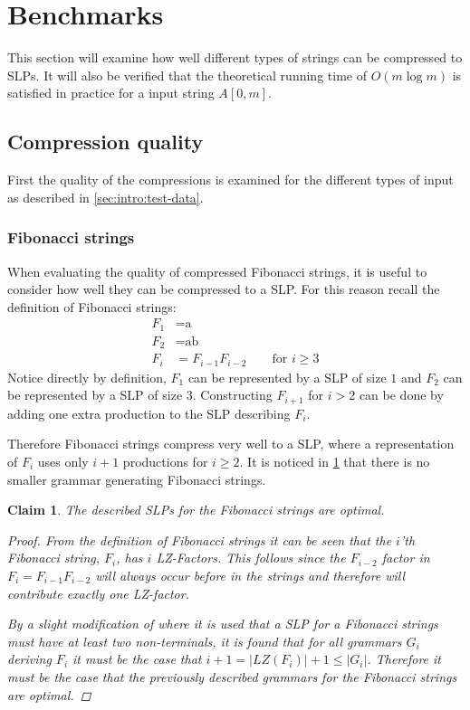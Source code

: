 \documentclass[twoside,11pt,openright]{report}
\newcommand{\str}[3]{#1[#2, #3]}
\newtheorem{claim}{Claim}
\begin{document}
\clearpage
\section{Benchmarks}
\label{sec:compression:benchmarks}
This section will examine how well different types of strings can be compressed to SLPs. It will also be verified that the theoretical running time of $O(m\log{m})$ is satisfied in practice for a input string $\str{A}{0}{m}$.

\subsection{Compression quality}
First the quality of the compressions is examined for the different types of input as described in \cref{sec:intro:test-data}.

\subsubsection{Fibonacci strings}
\label{sec:compressing-Fibonacci-strings}
When evaluating the quality of compressed Fibonacci strings, it is useful to consider how well they can be compressed to a SLP. For this reason recall the definition of Fibonacci strings:
\begin{align*}
  F_1 &= \text{a} \\
  F_2 &= \text{ab} \\
  F_{i} &= F_{i - 1} F_{i - 2} \quad\quad \text{for } i \geq 3
\end{align*}
Notice directly by definition, $F_1$ can be represented by a SLP of size $1$ and $F_2$ can be represented by a SLP of size $3$. Constructing $F_{i + 1}$ for $i > 2$ can be done by adding one extra production to the SLP describing $F_{i}$.

Therefore Fibonacci strings compress very well to a SLP, where a representation of $F_{i}$ uses only $i + 1$ productions for $i \geq 2$. It is noticed in \cref{claim:fib-slp-optimal} that there is no smaller grammar generating Fibonacci strings.

\begin{claim}
  \label{claim:fib-slp-optimal}
  The described SLPs for the Fibonacci strings are optimal.
  \begin{proof}
    From the definition of Fibonacci strings it can be seen that the $i$'th Fibonacci string, $F_i$, has $i$ LZ-Factors. This follows since the $F_{i-2}$ factor in $F_i = F_{i - 1} F_{i - 2}$ will always occur before in the strings and therefore will contribute exactly one LZ-factor.

    By a slight modification of \cite[Theorem 1]{Rytter2003211} where it is used that a SLP for a Fibonacci strings must have at least two non-terminals, it is found that for all grammars $G_i$ deriving $F_i$ it must be the case that $i + 1 = |LZ(F_i)| + 1 \leq |G_i|$. Therefore it must be the case that the previously described grammars for the Fibonacci strings are optimal.
  \end{proof}
\end{claim}
\end{document}
